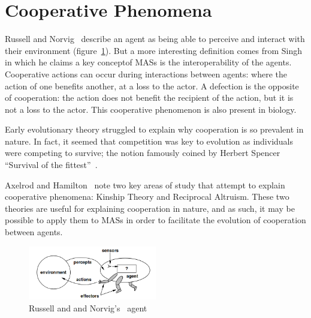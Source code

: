 \documentclass[]{final_report}
\begin{document}
\section{Cooperative Phenomena}
Russell and Norvig~\cite{russell2016artificial} describe an agent as being able to perceive and interact with their environment (figure~\ref{fig:rnagent}). But a more interesting definition comes from Singh~\cite{singh1998agent} in which he claims a key conceptof MASs is the interoperability of the agents. Cooperative actions can occur during interactions between agents: where the action of one benefits another, at a loss to the actor. A defection is the opposite of cooperation: the action does not benefit the recipient of the action, but it is not a loss to the actor. This cooperative phenomenon is also present in biology.\par
Early evolutionary theory struggled to explain why cooperation is so prevalent in nature. In fact, it seemed that competition was key to evolution as individuals were competing to survive; the notion famously coined by Herbert Spencer ``Survival of the fittest''~\cite{spencer1864principles}.\par
Axelrod and Hamilton~\cite{evolution_of_cooperation} note two key areas of study that attempt to explain cooperative phenomena: Kinship Theory and Reciprocal Altruism. These two theories are useful for explaining cooperation in nature, and as such, it may be possible to apply them to MASs in order to facilitate the evolution of cooperation between agents.
\begin{figure}
	\center
	\includegraphics[width=0.5\textwidth]{russellnorvigagent.png}
	\caption{Russell and and Norvig's~\cite{russell2016artificial} agent}
	\label{fig:rnagent}
\end{figure}
\end{document}
